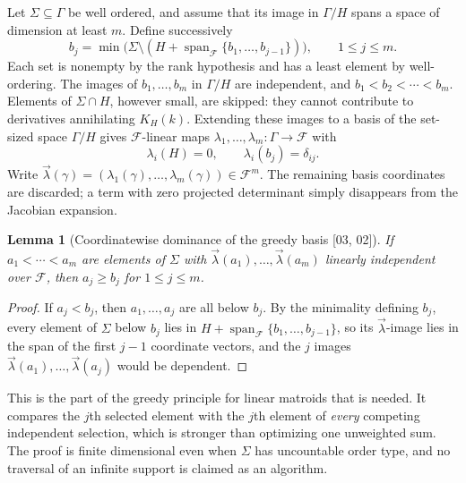 \documentclass[11pt,letterpaper]{article}
\numberwithin{equation}{section}
\newtheorem{lemma}[lemma]{Lemma}
\theoremstyle{definition}
\theoremstyle{remark}
\newcommand{\src}[1]{\textup{[#1]}}%
\begin{document}
Let $\Sigma\subseteq\Gamma$ be well ordered, and assume that its image in
$\Gamma/H$ spans a space of dimension at least $m$. Define successively
\begin{equation}\label{adr:sr:eq:greedy}
 b_j=\min\bigl(\Sigma\setminus(H+\operatorname{span}_{\mathcal F}\{b_1,\ldots,b_{j-1}\})\bigr),
 \qquad 1\le j\le m.
\end{equation}
Each set is nonempty by the rank hypothesis and has a least element by
well-ordering. The images of $b_1,\ldots,b_m$ in $\Gamma/H$ are independent,
and $b_1<b_2<\cdots<b_m$. Elements of $\Sigma\cap H$, however small, are
skipped: they cannot contribute to derivatives annihilating $K_H(k)$.
Extending these images to a basis of the set-sized space $\Gamma/H$ gives
$\mathcal F$-linear maps $\lambda_1,\ldots,\lambda_m:\Gamma\to\mathcal F$ with
\begin{equation}\label{adr:sr:eq:dual}
 \lambda_i(H)=0,\qquad\lambda_i(b_j)=\delta_{ij}.
\end{equation}
Write $\vec\lambda(\gamma)=(\lambda_1(\gamma),\ldots,\lambda_m(\gamma))\in\mathcal F^m$.
The remaining basis coordinates are discarded; a term with zero projected
determinant simply disappears from the Jacobian expansion.

\begin{lemma}[Coordinatewise dominance of the greedy basis \src{03, 02}]
\label{adr:sr:lem:dominance}
If $a_1<\cdots<a_m$ are elements of $\Sigma$ with
$\vec\lambda(a_1),\ldots,\vec\lambda(a_m)$ linearly independent over
$\mathcal F$, then $a_j\ge b_j$ for $1\le j\le m$.
\end{lemma}
\begin{proof}
If $a_j<b_j$, then $a_1,\ldots,a_j$ are all below $b_j$. By the minimality
defining $b_j$, every element of $\Sigma$ below $b_j$ lies in
$H+\operatorname{span}_{\mathcal F}\{b_1,\ldots,b_{j-1}\}$, so its
$\vec\lambda$-image lies in the span of the first $j-1$ coordinate vectors,
and the $j$ images $\vec\lambda(a_1),\ldots,\vec\lambda(a_j)$ would be
dependent.
\end{proof}

This is the part of the greedy principle for linear matroids \cite{Edmonds}
that is needed. It compares the $j$th selected element with the $j$th
element of \emph{every} competing independent selection, which is stronger
than optimizing one unweighted sum. The proof is finite dimensional even when
$\Sigma$ has uncountable order type, and no traversal of an infinite support
is claimed as an algorithm.
\end{document}
